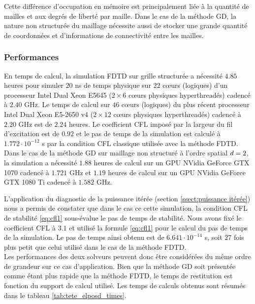 Cette différence d'occupation en mémoire est principalement liée à la quantité de mailles
et aux degrés de liberté par maille. Dans le cas de la méthode GD,
la nature non structurée du maillage nécessite aussi de stocker une grande
quantité de coordonnées et d'informations de connectivité entre les mailles.


\subsubsection{Performances}
\label{sssect:tete_simplifiee_comp_perfs}

En temps de calcul, la simulation FDTD sur grille structurée a nécessité $4.85$ heures
pour simuler $20$ ns de temps physique sur $22$ cœurs (logiques) d'un processeur
Intel Dual Xeon E5645 ($2 \times 6$ cœurs physiques hyperthreadés) cadencé à $2.40$ GHz.
Le temps de calcul sur $46$ cœurs (logiques) du plus récent processeur Intel Dual Xeon E5-2650 v4
($2 \times 12$ cœurs physiques hyperthreadés) cadencé à $2.20$ GHz est de $2.24$ heures.
Le coefficient CFL imposé par la largeur du fil d'excitation est de $0.92$
et le pas de temps de la simulation est calculé à $1.772 \cdot 10^{-12}$ s
par la condition CFL classique utilisée avec la méthode FDTD.
\\


Dans le cas de la méthode GD sur maillage non structuré à l'ordre spatial $d=2$,
la simulation a nécessité $1.88$ heures de
calcul sur un GPU NVidia GeForce GTX 1070 cadencé à $1.721$ GHz
et $1.19$ heures de
calcul sur un GPU NVidia GeForce GTX 1080 Ti cadencé à $1.582$ GHz.

L'application du diagnostic de la puissance itérée (section \ref{ssect:puissance itérée})
nous a permis de constater que dans le cas ce cette simulation, la condition
CFL de stabilité \eqref{eq:cfl1} sous-évalue le pas de temps de stabilité.
Nous avons fixé le coefficient CFL à $3.1$ et utilisé la formule \eqref{eq:cfl1}
pour le calcul du pas de temps de la simulation.
Le pas de temps ainsi obtenu est de $6.641 \cdot 10^{-14}$ s,
soit $27$ fois plus petit que celui utilisé dans le cas de la méthode FDTD.
\\

Les performances des deux solveurs peuvent donc être considérées du même ordre de grandeur
sur ce cas d'application.
Bien que la méthode GD soit présentée comme étant plus rapide que la méthode
FDTD, le temps de restitution est fonction du support de calcul utilisé.
Les temps de calculs obtenus sont résumés dans le tableau \ref{tab:tete_elposd_times}.


